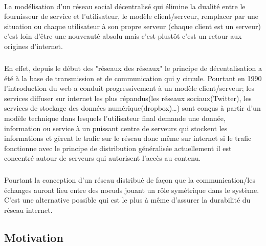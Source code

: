 \paragraph{}
La modélisation d'un réseau social décentralisé qui élimine la dualité entre le fournisseur de service et l'utilisateur, le modèle client/serveur, remplacer par une situation ou chaque utilisateur à son propre serveur (chaque client est un serveur) c'est loin d'être une nouveauté absolu mais c'est plustôt c'est un retour aux origines d'internet.
\subparagraph{} 
En effet, depuis le début des "réseaux des réseaux" le principe de décentalisation a été à la base de transmission et de communication qui y circule.  Pourtant en 1990 l'introduction du web a conduit progressivement à un modèle client/serveur;  les services diffuser sur internet les plus répandus(les réseaux sociaux(Twitter), les services de stockage des données numérique(dropbox)…)
sont conçus à partir d'un modèle technique dans lesquels l'utilisateur final demande une donnée, information ou service à un puissant centre de serveurs qui stockent les informations et gèrent le trafic sur le réseau donc même sur internet si le trafic fonctionne avec le principe de distribution généralisée actuellement il est concentré autour de serveurs qui autorisent l'accès au contenu.
\subparagraph{}
Pourtant la conception d'un réseau distribué de façon que la communication/les échanges auront lieu entre des noeuds jouant un rôle symétrique dans le système. C'est une alternative possible qui est le plus à même d'assurer la durabilité du réseau internet.
\subsection{Motivation} 

